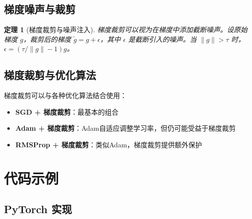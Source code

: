\documentclass{article}
\newtheorem{theorem}{定理}[section]
\begin{document}
\subsection{梯度噪声与裁剪}

\begin{theorem}[梯度裁剪与噪声注入]
梯度裁剪可以视为在梯度中添加截断噪声。设原始梯度 $g$，裁剪后的梯度 $\tilde{g} = g + \epsilon$，其中 $\epsilon$ 是截断引入的噪声。当 $\|g\| > \tau$ 时，$\epsilon = (\tau/\|g\| - 1)g$。
\end{theorem}

\subsection{梯度裁剪与优化算法}

梯度裁剪可以与各种优化算法结合使用：

\begin{itemize}
    \item \textbf{SGD + 梯度裁剪}：最基本的组合
    \item \textbf{Adam + 梯度裁剪}：Adam自适应调整学习率，但仍可能受益于梯度裁剪
    \item \textbf{RMSProp + 梯度裁剪}：类似Adam，梯度裁剪提供额外保护
\end{itemize}

\section{代码示例}

\subsection{PyTorch 实现}
\end{document}
